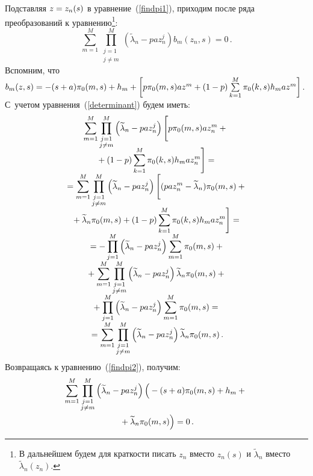 \begin{multicols}{2}
Подставляя $z\hm=z_n(s)$ в уравнение~(\ref{findpi1}), приходим после ряда
преобразований к уравнению\footnote{В дальнейшем будем для краткости писать
$z_n$ вместо $z_n(s)$ и $\widetilde{\lambda}_n$ вместо
$\widetilde{\lambda}_n(z_n)$.}:
\begin{equation}
\sum\limits_{m=1}^M\prod\limits_{\substack{j=1\\j\neq m}}^M
\left(\widetilde{\lambda}_n-
paz_n^j\right) b_m(z_n,s)=0\,.\label{findpi2}
\end{equation}
Вспомним, что $b_m(z,s)\hm=-(s\hm+a)\pi_0(m,s)\hm+h_m+
\left[p\pi_0(m,s)az^m+(1-p)\sum\limits_{k=1}^{M}\pi_0(k,s)h_m az^m\right]$.
С~учетом уравнения~(\ref{determinant}) будем иметь:
\begin{multline*}
\sum\limits_{m=1}^M\prod\limits_{\substack{j=1\\j\neq m}}^M
\left(\widetilde{\lambda}_n- paz_n^j\right)\left[
\vphantom{\sum\limits_{k=1}^{M}}
p\pi_0(m,s)az_n^m+{}\right.\\[-6pt]
\left.{}+(1-p)\sum\limits_{k=1}^{M}\pi_0(k,s)h_m az_n^m\right]={}\\[-4pt]
{}=\sum\limits_{m=1}^M\prod\limits_{\substack{j=1\\j\neq m}}^M
\left(\widetilde{\lambda}_n- paz_n^j\right)\left[
\vphantom{\sum\limits_{k=1}^{M}}
(paz_n^m-\widetilde{\lambda}_n)\pi_0(m,s)+{}\right.\\[-4pt]
\left.{}+
\widetilde{\lambda}_n \pi_0(m,s)+(1-p)\sum\limits_{k=1}^{M}\pi_0(k,s)h_m az_n^m\right]={}\\[-4pt]
{}=-\prod\limits_{j=1}^M
\left(\widetilde{\lambda}_n-paz_n^j\right)\sum\limits_{m=1}^M \pi_0(m,s)+{}\\[-4pt]
{}+
\sum\limits_{m=1}^M\prod\limits_{\substack{j=1\\j\neq m}}^M
\left(\widetilde{\lambda}_n-paz_n^j\right)\widetilde{\lambda}_n \pi_0(m,s)+{}\\[-4pt]
{}+\prod\limits_{j=1}^M
\left(\widetilde{\lambda}_n-paz_n^j\right)\sum\limits_{m=1}^M \pi_0(m,s)={}\\[-4pt]
{}=\sum\limits_{m=1}^M\prod\limits_{\substack{j=1\\j\neq m}}^M
\left(\widetilde{\lambda}_n-paz_n^j\right)\widetilde{\lambda}_n \pi_0(m,s)\,.
\end{multline*}
Возвращаясь к уравнению~(\ref{findpi2}), получим:
\begin{multline*}
\sum\limits_{m=1}^M\prod\limits_{\substack{j=1\\j\neq m}}^M
\left(\widetilde{\lambda}_n-paz_n^j\right)\left(
\vphantom{\widetilde{\lambda}_n}
-(s+a)\pi_0(m,s)+h_m+{}\right.\\
\left.{}+\widetilde{\lambda}_n \pi_0(m,s)\right)=0\,.
\end{multline*}


\end{multicols}
